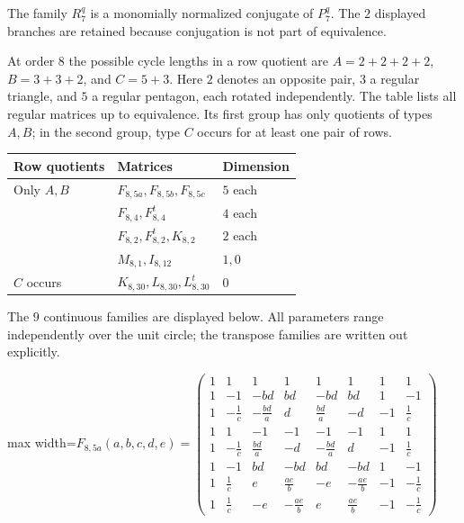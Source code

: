 \documentclass[11pt,a4paper]{article}
\theoremstyle{plain}
\theoremstyle{definition}
\numberwithin{equation}{section}
\begin{document}
The family $R_7^q$ is a monomially normalized conjugate of $P_7^q$. The $2$ displayed branches are retained because conjugation is not part of equivalence.

At order $8$ the possible cycle lengths in a row quotient are $A=2+2+2+2$, $B=3+3+2$, and $C=5+3$. Here $2$ denotes an opposite pair, $3$ a regular triangle, and $5$ a regular pentagon, each rotated independently. The table lists all regular matrices up to equivalence. Its first group has only quotients of types $A,B$; in the second group, type $C$ occurs for at least one pair of rows.
\begin{center}\small
\begin{tabular}{@{}p{}p{}p{}@{}}\toprule
Row quotients & Matrices & Dimension\\\midrule
Only $A,B$ & $F_{8,5a},F_{8,5b},F_{8,5c}$ & $5$ each\\
& $F_{8,4},F_{8,4}^{t}$ & $4$ each\\
& $F_{8,2},F_{8,2}^{t},K_{8,2}$ & $2$ each\\
& $M_{8,1},I_{8,12}$ & $1,0$\\
$C$ occurs & $K_{8,30},L_{8,30},L_{8,30}^{t}$ & $0$\\\bottomrule
\end{tabular}
\end{center}
The $9$ continuous families are displayed below. All parameters range independently over the unit circle; the transpose families are written out explicitly.

\begin{center}\normalsize\setlength{\arraycolsep}{3.8pt}
\begin{adjustbox}{max width=\textwidth}$\displaystyle F_{8,5a}(a,b,c,d,e)=\begin{pmatrix}
1 & 1 & 1 & 1 & 1 & 1 & 1 & 1 \\
1 & -1 & -bd & bd & -bd & bd & 1 & -1 \\
1 & -\frac{1}{c} & -\frac{bd}{a} & d & \frac{bd}{a} & -d & -1 & \frac{1}{c} \\
1 & 1 & -1 & -1 & -1 & -1 & 1 & 1 \\
1 & -\frac{1}{c} & \frac{bd}{a} & -d & -\frac{bd}{a} & d & -1 & \frac{1}{c} \\
1 & -1 & bd & -bd & bd & -bd & 1 & -1 \\
1 & \frac{1}{c} & e & \frac{ae}{b} & -e & -\frac{ae}{b} & -1 & -\frac{1}{c} \\
1 & \frac{1}{c} & -e & -\frac{ae}{b} & e & \frac{ae}{b} & -1 & -\frac{1}{c}
\end{pmatrix}$\end{adjustbox}
\end{center}
\end{document}
